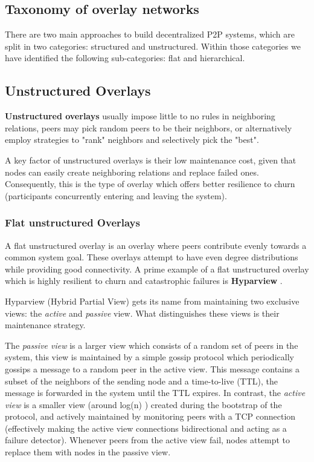 \subsection{Taxonomy of overlay networks}

There are two main approaches to build decentralized P2P systems, which are split in two categories: structured and unstructured. Within those categories we have identified the following sub-categories: flat and hierarchical. 

\subsection{Unstructured Overlays}

\textbf{Unstructured overlays} usually impose little to no rules in neighboring relations, peers may pick random peers to be their neighbors, or alternatively employ strategies to "rank" neighbors and selectively pick the "best".

A key factor of unstructured overlays is their low maintenance cost, given that nodes can easily create neighboring relations and replace failed ones. Consequently, this is the type of overlay which offers better resilience to churn \cite{stutzbach2006understanding} (participants concurrently entering and leaving the system).

\subsubsection{Flat unstructured Overlays}

A flat unstructured overlay is an overlay where peers contribute evenly towards a common system goal. These overlays attempt to have even degree distributions while providing good connectivity. A prime example of a flat unstructured overlay which is highly resilient to churn and catastrophic failures is \textbf{Hyparview} \cite{Hyparview}. 


Hyparview (Hybrid Partial View) gets its name from maintaining two exclusive views: the \textit{active} and \textit{passive} view. What distinguishes these views is their maintenance strategy. 

The \textit{passive view} is a larger view which consists of a random set of peers in the system, this view is maintained by a simple gossip protocol which periodically gossips a message to a random peer in the active view. This message contains a subset of the neighbors of the sending node and a time-to-live (TTL), the message is forwarded in the system until the TTL expires. In contrast, the \textit{active view} is a smaller view (around log(n) ) created during the bootstrap of the protocol, and actively maintained by monitoring peers with a TCP connection (effectively making the active view connections bidirectional and acting as a failure detector). Whenever peers from the active view fail, nodes attempt to replace them with nodes in the passive view.

